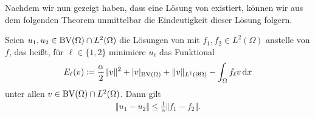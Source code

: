 Nachdem wir nun gezeigt haben, dass eine Lösung von
 existiert, können wir aus dem folgenden
Theorem unmittelbar die Eindeutigkeit dieser Lösung folgern. 

\begin{theorem}[Stabilität]
  \label{thm:contProbStabAndUniqu}
  Seien $u_1,u_2\in \textup{BV}(\Omega)\cap L^2(\Omega)$ die Lösungen von
   mit $f_1,f_2\in L^2(\Omega)$ anstelle von $f$,
  das heißt, für $\ell\in\{1,2\}$ minimiere $u_\ell$ das Funktional
  \begin{align*}
    E_\ell(v)
    \coloneqq 
    \frac{\alpha}{2}\Vert v\Vert^2 + |v|_{\textup{BV}(\Omega)} 
    + \Vert v\Vert_{L^1(\partial\Omega)} - \int_\Omega f_\ell v\,\mathrm{d}x
  \end{align*}
  unter allen $v\in\textup{BV}(\Omega)\cap L^2(\Omega)$.
  Dann gilt 
  \begin{align*}
    \Vert u_1 - u_2\Vert 
    \leq\frac{1}{\alpha}\Vert f_1-f_2\Vert.
  \end{align*}
\end{theorem}

